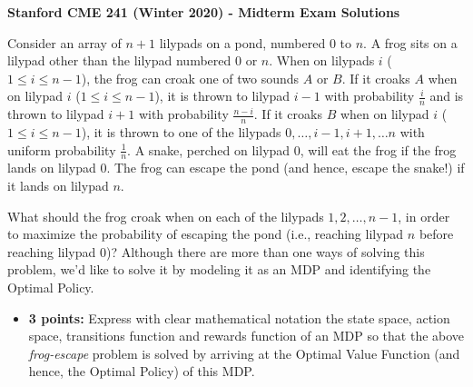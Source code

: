 \documentclass[12pt]{exam}
\begin{document}
\begin{center}
{\large {\bf Stanford CME 241 (Winter 2020) - Midterm Exam Solutions}}

\end{center}
\vspace{5mm}
 
\begin{questions}
 Consider an array of $n+1$ lilypads on a pond, numbered $0$ to $n$. A frog sits on a lilypad other than the lilypad numbered $0$ or $n$.  When on lilypads $i$ ($1\leq i \leq n-1$), the frog can croak one of two sounds $A$ or
$B$. If it croaks $A$ when on lilypad $i$ ($1 \leq i \leq n-1$), it is thrown to lilypad $i-1$ with probability $\frac i n$ and is thrown to lilypad $i+1$ with probability $\frac {n-i} n$. If it croaks $B$ when on lilypad $i$ ($1\leq i \leq n-1$), it is thrown to one of the lilypads $0, \ldots, i-1, i+1, \ldots n$ with uniform probability $\frac 1 n$. A snake, perched on lilypad $0$, will eat the frog if the frog lands on lilypad $0$. The frog can escape the pond (and hence, escape the snake!) if it lands on lilypad $n$.

What should the frog croak when on each of the lilypads $1, 2, \ldots, n-1$, in order to maximize the probability of escaping the pond (i.e., reaching lilypad $n$ before reaching lilypad $0$)? Although there are more than one ways of solving this problem, we'd like to solve it by modeling it as an MDP and identifying the Optimal Policy.

\begin{itemize}
\item {\bf 3 points:} Express with clear mathematical notation the state space, action space, transitions function and rewards function of an MDP so that the above {\em frog-escape} problem is solved by arriving at the Optimal Value Function (and hence, the Optimal Policy) of this MDP.


\end{itemize}
\end{questions}
\end{document}
